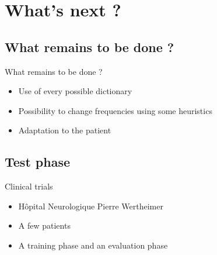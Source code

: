\documentclass[graphics]{beamer}
\begin{document}



\section{What's next ?}

\subsection{What remains to be done ?}

\begin{frame}{What remains to be done ?}
	\begin{center}
		\begin{itemize}
			\item Use of every possible dictionary
			\item Possibility to change frequencies using some heuristics
			\item Adaptation to the patient
		\end{itemize}
	\end{center}
\end{frame}

\subsection{Test phase}

\begin{frame}{Clinical trials}
	\begin{center}
		\begin{itemize}
			\item Hôpital Neurologique Pierre Wertheimer
			\item A few patients
			\item A training phase and an evaluation phase
		\end{itemize}
	\end{center}
\end{frame}
\end{document}

